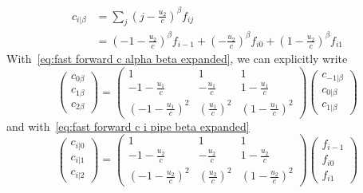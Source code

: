 \begin{equation}
  \begin{aligned}
    \label{eq:fast forward c i pipe beta expanded}
    c_{i|\beta} & = \sum_{j} {\left(j-\frac{u_2}{c}\right)}^\beta f_{ij} \\
    & = {\left(-1-\frac{u_2}{c}\right)}^\beta f_{i-1} + {\left(-\frac{u_2}{c}\right)}^\beta f_{i0} + {\left(1-\frac{u_2}{c}\right)}^\beta f_{i1}
  \end{aligned}
\end{equation}
With~\eqref{eq:fast forward c alpha beta expanded}, we can explicitly write
\begin{equation}
  \label{eq:fast forward c alpha beta matrix}
  \begin{pmatrix}
    c_{0\beta} \\
    c_{1\beta} \\
    c_{2\beta}
  \end{pmatrix}
  =
  \begin{pmatrix}
    1 & 1 & 1 \\
    -1-\frac{u_1}{c} & - \frac{u_1}{c} &   1-\frac{u_1}{c} \\
    {\left(-1-\frac{u_1}{c}\right)}^2 & {\left(\frac{u_1}{c}\right)}^2 &  {\left(1-\frac{u_1}{c}\right)}^2
  \end{pmatrix}
  \begin{pmatrix}
    c_{-1|\beta} \\
    c_{0|\beta} \\
    c_{1|\beta}
  \end{pmatrix}
\end{equation}
and with~\eqref{eq:fast forward c i pipe beta expanded}
\begin{equation}
  \label{eq:fast forward c i pipe beta matrix}
  \begin{pmatrix}
    c_{i|0} \\
    c_{i|1} \\
    c_{i|2}
  \end{pmatrix}
  =
  \begin{pmatrix}
    1 & 1 & 1 \\
    -1-\frac{u_2}{c} & - \frac{u_2}{c} &   1-\frac{u_2}{c} \\
    {\left(-1-\frac{u_2}{c}\right)}^2 & {\left(\frac{u_2}{c}\right)}^2 &  {\left(1-\frac{u_2}{c}\right)}^2
  \end{pmatrix}
  \begin{pmatrix}
    f_{i-1} \\
    f_{i0} \\
    f_{i1}
  \end{pmatrix}
\end{equation}

